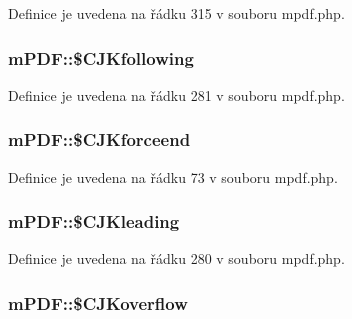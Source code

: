 Definice je uvedena na řádku 315 v souboru mpdf.\-php.

\hypertarget{classm_p_d_f_aded18dfeb08e331513ae8b2b374d7cf2}{
\subsubsection[{\$\-C\-J\-Kfollowing}]{\setlength{\rightskip}{0pt plus 5cm}m\-P\-D\-F\-::\$\-C\-J\-Kfollowing}}\label{classm_p_d_f_aded18dfeb08e331513ae8b2b374d7cf2}


Definice je uvedena na řádku 281 v souboru mpdf.\-php.

\hypertarget{classm_p_d_f_a81bb480acd714f9425f4bb036f9cd47b}{
\subsubsection[{\$\-C\-J\-Kforceend}]{\setlength{\rightskip}{0pt plus 5cm}m\-P\-D\-F\-::\$\-C\-J\-Kforceend}}\label{classm_p_d_f_a81bb480acd714f9425f4bb036f9cd47b}


Definice je uvedena na řádku 73 v souboru mpdf.\-php.

\hypertarget{classm_p_d_f_a12a0bf725cc37f3f8cec323b7b3a33d9}{
\subsubsection[{\$\-C\-J\-Kleading}]{\setlength{\rightskip}{0pt plus 5cm}m\-P\-D\-F\-::\$\-C\-J\-Kleading}}\label{classm_p_d_f_a12a0bf725cc37f3f8cec323b7b3a33d9}


Definice je uvedena na řádku 280 v souboru mpdf.\-php.

\hypertarget{classm_p_d_f_a568d3e8a6442e617e51b8860cb330599}{
\subsubsection[{\$\-C\-J\-Koverflow}]{\setlength{\rightskip}{0pt plus 5cm}m\-P\-D\-F\-::\$\-C\-J\-Koverflow}}\label{classm_p_d_f_a568d3e8a6442e617e51b8860cb330599}


